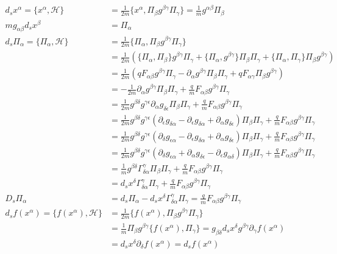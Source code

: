 \documentclass[11pt]{article}
\begin{document}
\begin{equation}
\begin{aligned}
d_s x^\alpha = \{x^\alpha, \mathcal{H}\} &= \frac{1}{2m} \{x^\alpha, \Pi_\beta g^{\beta\gamma} \Pi_\gamma\} = \frac{1}{m} g^{\alpha \beta} \Pi_\beta \\
m g_{\alpha\beta} d_s x^\beta &= \Pi_\alpha \\
d_s \Pi_\alpha = \{ \Pi_\alpha , \mathcal{H} \} &= \frac{1}{2m} \{\Pi_\alpha, \Pi_\beta g^{\beta\gamma} \Pi_\gamma\} \\
&= \frac{1}{2m} \left( \{\Pi_\alpha, \Pi_\beta\}  g^{\beta\gamma} \Pi_\gamma + \{\Pi_\alpha,  g^{\beta\gamma} \} \Pi_\beta \Pi_\gamma + \{\Pi_\alpha,  \Pi_\gamma\} \Pi_\beta g^{\beta\gamma} \right)  \\
&= \frac{1}{2m} \left( q F_{\alpha \beta}  g^{\beta\gamma} \Pi_\gamma - \partial_\alpha g^{\beta\gamma} \Pi_\beta \Pi_\gamma + q F_{\alpha \gamma} \Pi_\beta g^{\beta\gamma} \right)  \\
&= - \frac{1}{2m} \partial_\alpha g^{\beta\gamma} \Pi_\beta \Pi_\gamma + \frac{q}{m} F_{\alpha\beta} g^{\beta\gamma} \Pi_\gamma \\
&= \frac{1}{2m} g^{\beta\delta} g^{\gamma\epsilon} \partial_\alpha g_{\delta\epsilon} \Pi_\beta \Pi_\gamma + \frac{q}{m} F_{\alpha\beta} g^{\beta\gamma} \Pi_\gamma \\
&= \frac{1}{2m} g^{\beta\delta} g^{\gamma\epsilon}(\partial_\epsilon g_{\delta\alpha} - \partial_\epsilon g_{\delta\alpha} + \partial_\alpha g_{\delta\epsilon} ) \Pi_\beta \Pi_\gamma + \frac{q}{m} F_{\alpha\beta} g^{\beta\gamma} \Pi_\gamma \\
&= \frac{1}{2m} g^{\beta\delta} g^{\gamma\epsilon}(\partial_\delta g_{\epsilon\alpha} - \partial_\epsilon g_{\delta\alpha} + \partial_\alpha g_{\delta\epsilon} ) \Pi_\beta \Pi_\gamma + \frac{q}{m} F_{\alpha\beta} g^{\beta\gamma} \Pi_\gamma \\
&= \frac{1}{2m} g^{\beta\delta} g^{\gamma\epsilon}(\partial_\delta g_{\epsilon\alpha} + \partial_\alpha g_{\delta\epsilon} - \partial_\epsilon g_{\alpha\delta}  ) \Pi_\beta \Pi_\gamma + \frac{q}{m} F_{\alpha\beta} g^{\beta\gamma} \Pi_\gamma \\
&= \frac{1}{m} g^{\beta\delta} \Gamma^\gamma_{\delta\alpha} \Pi_\beta \Pi_\gamma + \frac{q}{m} F_{\alpha\beta} g^{\beta\gamma} \Pi_\gamma \\
&= d_sx^\delta \Gamma^\gamma_{\delta\alpha} \Pi_\gamma + \frac{q}{m} F_{\alpha\beta} g^{\beta\gamma} \Pi_\gamma \\
D_s \Pi_\alpha &= d_s \Pi_\alpha - d_sx^\delta \Gamma^\gamma_{\delta\alpha} \Pi_\gamma = \frac{q}{m} F_{\alpha\beta} g^{\beta\gamma} \Pi_\gamma \\
d_s f(x^\alpha) =\{f(x^\alpha), \mathcal{H}\} &= \frac{1}{2m} \{f(x^\alpha), \Pi_\beta g^{\beta\gamma} \Pi_\gamma\} \\
&= \frac{1}{m} \Pi_\beta g^{\beta\gamma} \{f(x^\alpha), \Pi_\gamma\} = g_{\beta\delta} d_s x^\delta g^{\beta\gamma} \partial_\gamma f(x^\alpha) \\
&= d_s x^\delta \partial_\delta f(x^\alpha) = d_s f(x^\alpha) \\
\end{aligned}
\end{equation}
\end{document}
